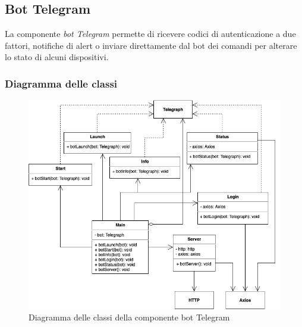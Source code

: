 \subsection{Bot Telegram}
	La componente \textit{bot Telegram} permette di ricevere codici di autenticazione a due fattori, notifiche di alert o inviare direttamente dal bot dei comandi per alterare lo stato di alcuni dispositivi. 
\subsubsection{Diagramma delle classi}%
	\begin{figure}[H]
		\centering
		\includegraphics[scale=0.600]{res/images/BOTTELEGRAM/ClassiTelegram.png}
		\caption{Diagramma delle classi della componente bot Telegram}
	\end{figure}
